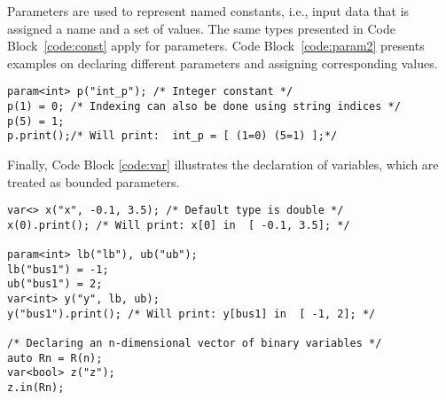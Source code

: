 \documentclass{article}
\newcommand{\Gravity}{{\sc Gravity}}
\begin{document}
Parameters are used to represent named constants, i.e., input data that is assigned a name and a set of values.
The same types presented in Code Block~\ref{code:const} apply for parameters. Code Block~\ref{code:param2} presents examples on declaring different parameters and assigning corresponding values.
\begin{code}[h!]
\begin{verbatim}
param<int> p("int_p"); /* Integer constant */
p(1) = 0; /* Indexing can also be done using string indices */
p(5) = 1;
p.print();/* Will print:  int_p = [ (1=0) (5=1) ];*/
\end{verbatim}
\caption{Declaring Parameters in \Gravity{}}
\label{code:param2}
\end{code}
Finally, Code Block \ref{code:var} \mbox{illustrates} the declaration of variables, which are treated as bounded parameters.
\begin{code}[h!]
\begin{verbatim}
var<> x("x", -0.1, 3.5); /* Default type is double */
x(0).print(); /* Will print: x[0] in  [ -0.1, 3.5]; */

param<int> lb("lb"), ub("ub");
lb("bus1") = -1;
ub("bus1") = 2;
var<int> y("y", lb, ub);    
y("bus1").print(); /* Will print: y[bus1] in  [ -1, 2]; */

/* Declaring an n-dimensional vector of binary variables */
auto Rn = R(n);
var<bool> z("z");
z.in(Rn);
\end{verbatim}
\caption{Declaring Variables in \Gravity{}}
\label{code:var}
\end{code}
\end{document}
